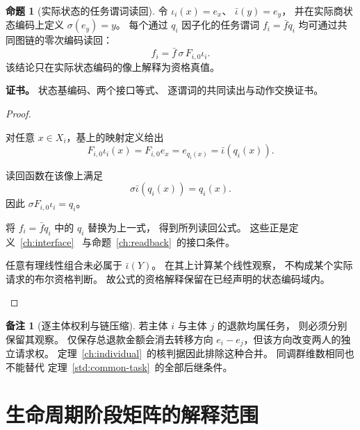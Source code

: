\documentclass[UTF8,12pt,a4paper,openany,fontset=none,zihao=false]{ctexrep}
\theoremstyle{definition}
\newtheorem{proposition}{命题}[chapter]
\newtheorem{remark}{备注}[chapter]
\newenvironment{certificate}{\par\noindent\textbf{证书。}\ignorespaces}{\par}
\newcommand{\1}{\mathbf 1}
\begin{document}
\begin{proposition}[实际状态的任务谓词读回]
\label{std:readback}
令 \(\iota_i(x)=e_x\)、
\(\bar\iota(y)=e_y\)，
并在实际商状态编码上定义 \(\sigma(e_y)=y\)。
每个通过 \(q_i\) 因子化的任务谓词
\(f_i=\bar f q_i\) 均可通过共同图链的零次编码读回：
\[
f_i=\bar f\,\sigma\,F_{i,0}\iota_i.
\]
该结论只在实际状态编码的像上解释为资格真值。
\end{proposition}
\begin{certificate}
状态基编码、两个接口等式、
逐谓词的共同读出与动作交换证书。
\end{certificate}
\begin{proof}
\begin{semanticsteps}
\item 对任意 \(x\in X_i\)，基上的映射定义给出
\[
F_{i,0}\iota_i(x)
=F_{i,0}e_x
=e_{q_i(x)}
=\bar\iota(q_i(x)).
\]
\item 读回函数在该像上满足
\[
\sigma\bar\iota(q_i(x))=q_i(x).
\]
因此 \(\sigma F_{i,0}\iota_i=q_i\)。
\item 将 \(f_i=\bar f q_i\) 中的 \(q_i\) 替换为上一式，
得到所列读回公式。
这些正是定义~\ref{ch:interface}~
与命题~\ref{ch:readback}~的接口条件。
\item 任意有理线性组合未必属于
\(\bar\iota(Y)\)。
在其上计算某个线性观察，
不构成某个实际请求的布尔资格判断。
故公式的资格解释保留在已经声明的状态编码域内。
\end{semanticsteps}
\end{proof}

\begin{remark}[逐主体权利与链压缩]
若主体 \(i\) 与主体 \(j\) 的退款均属任务，
则必须分别保留其观察。
仅保存总退款金额会消去转移方向
\(e_i-e_j\)，但该方向改变两人的独立请求权。
定理~\ref{ch:individual}~的核判据因此排除这种合并。
同调群维数相同也不能替代
定理~\ref{std:common-task}~的全部后继条件。
\end{remark}

\section{生命周期阶段矩阵的解释范围}
\end{document}
